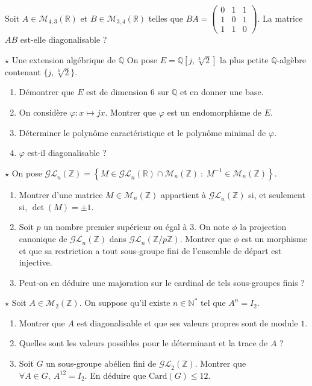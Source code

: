 \documentclass[french,a4paper]{article}
\newcommand{\N}{\mathbb{N}}
\newcommand{\Z}{\mathbb{Z}}
\newcommand{\Q}{\mathbb{Q}}
\newcommand{\R}{\mathbb{R}}
\newcommand{\st}{^*}
\newcommand{\inv}{^{-1}}
\newcommand{\card}{\text{Card}}
\theoremstyle{plain}
\theoremstyle{definition}
\theoremstyle{remark}
\begin{document}
\begin{ex}{}
	Soit $A\in\mathcal{M}_{4,3}(\R)$ et $B\in\mathcal{M}_{3,4}(\R)$ telles que $BA=\displaystyle\begin{pmatrix}
		0&1&1\\
		1&0&1\\
		1&1&0
	\end{pmatrix}$. La matrice $AB$ est-elle diagonalisable ?
\end{ex}

\begin{ex}[Châteaux]{$\star$ Une extension algébrique de $\Q$}
	On pose $E=\Q[j,\sqrt[3]{2}]$ la plus petite $\Q$-algèbre contenant $\{j,\sqrt[3]{2}\}$.
	\begin{enumerate}
		\item Démontrer que $E$ est de dimension $6$ sur $\Q$ et en donner une base.
		\item On considère $\varphi :x\mapsto jx$. Montrer que $\varphi$ est un endomorphisme de $E$.
		\item Déterminer le polynôme caractéristique et le polynôme minimal de $\varphi$.
		\item $\varphi$ est-il diagonalisable ?
	\end{enumerate}
\end{ex}

\begin{ex}[Châteaux]{$\star$}
	On pose $\mathcal{GL}_n(\Z)=\left\{M\in\mathcal{GL}_n(\R)\cap\mathcal{M}_n(\Z)\ :\ M\inv\in\mathcal{M}_n(\Z)\right\}$.
	\begin{enumerate}
		\item Montrer d'une matrice $M\in\mathcal{M}_n(\Z)$ appartient à $\mathcal{GL}_n(\Z)$ si, et seulement si, $\det(M)=\pm1$.
		\item Soit $p$ un nombre premier supérieur ou égal à $3$. On note $\phi$ la projection canonique de $\mathcal{GL}_n(\Z)$ dans $\mathcal{GL}_n(\Z/p\Z)$. Montrer que $\phi$ est un morphisme et que sa restriction a tout sous-groupe fini de l'ensemble de départ est injective.
		\item Peut-on en déduire une majoration sur le cardinal de tels sous-groupes finis ?
	\end{enumerate}
\end{ex}

\begin{ex}[Châteaux]{$\star$}
	Soit $A\in\mathcal{M}_2(\Z)$. On suppose qu'il existe $n\in\N\st$ tel que $A^n=I_2$.
	\begin{enumerate}
		\item Montrer que $A$ est diagonalisable et que ses valeurs propres sont de module $1$.
		\item Quelles sont les valeurs possibles pour le déterminant et la trace de $A$ ?
		\item Soit $G$ un sous-groupe abélien fini de $\mathcal{GL}_2(\Z)$. Montrer que $\forall A\in G,\  A^{12}=I_2$. En déduire que $\card(G)\leqslant 12$.
	\end{enumerate}
\end{ex}
\end{document}
